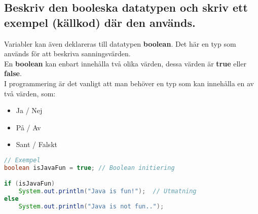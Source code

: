 \documentclass[../main.tex]{subfiles}
\begin{document}
\subsection{Beskriv den booleska datatypen och skriv ett exempel (källkod) där den används.}

Variabler kan även deklareras till datatypen \textbf{boolean}. Det här en typ som används för att beskriva sanningsvärden.
\\
En \textbf{boolean} kan enbart innehålla två olika värden, dessa värden är \textbf{true} eller \textbf{false}.
\\
I programmering är det vanligt att man behöver en typ som kan innehålla en av två värden, som:
\begin{itemize}
    \item Ja / Nej
    \item På / Av
    \item Sant / Falskt
\end{itemize}

\begin{lstlisting}[language=java]
// Exempel
boolean isJavaFun = true; // Boolean initiering

if (isJavaFun)
    System.out.println("Java is fun!");  // Utmatning
else
    System.out.println("Java is not fun..");
\end{lstlisting}
\end{document}
